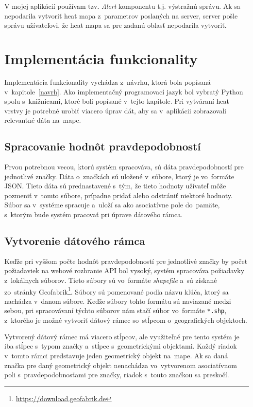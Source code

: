 V mojej aplikácií používam tzv. \emph{Alert} komponentu t.j. výstražnú správu. Ak sa nepodarila vytvoriť heat mapa z~parametrov poslaných na server, server pošle správu užívateľovi, že heat mapa sa pre zadanú oblasť nepodarila vytvoriť.


\section{Implementácia funkcionality}
Implementácia funkcionality vychádza z~návrhu, ktorá bola popísaná v~kapitole~\ref{navrh}. Ako implementačný programovací jazyk bol vybratý Python spolu s~knižnicami, ktoré boli popísané v~tejto kapitole. Pri vytváraní heat vrstvy je potrebné urobiť viacero úprav dát, aby sa v~aplikácii zobrazovali relevantné dáta na~mape.

\subsection*{Spracovanie hodnôt pravdepodobností}
Prvou potrebnou vecou, ktorú systém spracováva, sú dáta pravdepodobností pre jednotlivé značky. Dáta o~značkách sú uložené v~súbore, ktorý je vo~formáte JSON. Tieto dáta sú prednastavené s~tým, že tieto hodnoty užívateľ môže pozmeniť v~tomto súbore, prípadne pridať alebo odstrániť niektoré hodnoty. Súbor sa v~systéme spracuje a~uloží sa ako asociatívne pole do~pamäte, s~ktorým bude systém pracovať pri úprave dátového rámca.

\subsection*{Vytvorenie dátového rámca}
Keďže pri vyššom počte hodnôt pravdepodobností pre jednotlivé značky by počet požiadaviek na webové rozhranie API bol vysoký, systém spracováva požiadavky z~lokálnych súborov. Tieto súbory sú vo~formáte \emph{shapefile} a~sú získané zo~stránky Geofabrik\footnote{\url{https://download.geofabrik.de}}. Súbory sú pomenované podľa názvu kľúča, ktorý sa nachádza v~danom súbore. Keďže súbory tohto formátu sú naviazané medzi sebou, pri spracovávaní týchto súborov nám stačí súbor vo~formáte \texttt{*.shp}, z~ktorého je možné vytvoriť dátový rámec so~stĺpcom o~geografických objektoch.

Vytvorený dátový rámec má viacero stĺpcov, ale využiteľné pre tento systém je iba stĺpec s~typom značky a~stĺpec s~geometrickými objektami. Každý riadok v~tomto rámci predstavuje jeden geometrický objekt na~mape. Ak sa daná značka pre daný geometrický objekt nenachádza vo~vytvorenom asociatívnom poli s~pravdepodobnosťami pre značky, riadok s~touto značkou sa preskočí.

